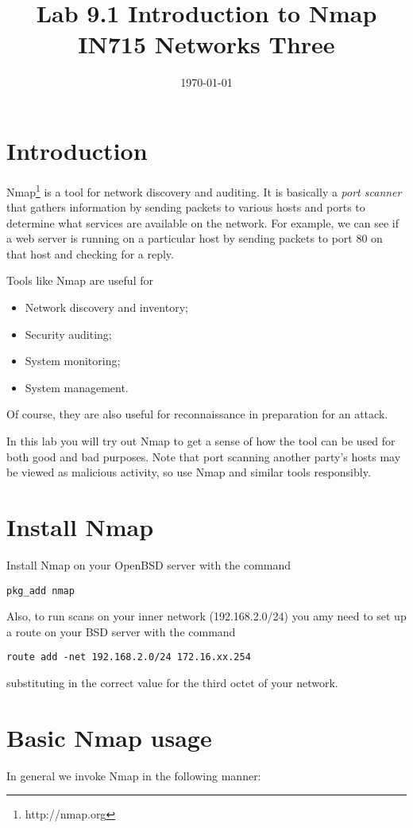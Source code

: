 \documentclass{article}
\begin{document}
\title{ Lab 9.1 Introduction to Nmap\\ IN715 Networks Three}
\date{\today}
\maketitle

\section*{Introduction}
Nmap\footnote{http://nmap.org} is a tool for network discovery and auditing.  It is basically a \emph{port scanner} that gathers information by sending packets to various hosts and ports to determine what services are available on the network.  For example, we can see if a web server is running on a particular host by sending packets to port 80 on that host and checking for a reply.

Tools like Nmap are useful for 

\begin{itemize}
    \item Network discovery and inventory;
    \item Security auditing;
    \item System monitoring;
    \item System management.
\end{itemize}

Of course, they are also useful for reconnaissance in preparation for an attack.

In this lab you will try out Nmap to get a sense of how the tool can be used for both good and bad purposes. Note that port scanning another party's hosts may be viewed as malicious activity, so use Nmap and similar tools responsibly.

\section{Install Nmap}
Install Nmap on your OpenBSD server with the command

\texttt{pkg\_add nmap}

Also, to run scans on your inner network (192.168.2.0/24) you amy need to set up a route on your BSD server with the command

\texttt{route add -net 192.168.2.0/24 172.16.xx.254}

substituting in the correct value for the third octet of your network.

\section{Basic Nmap usage}
In general we invoke Nmap in the following manner:
\end{document}
